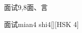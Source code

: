 \begin{entry}{面试}{9,8}{⾯、⾔}
  \begin{phonetics}{面试}{mian4 shi4}[][HSK 4]
  \end{phonetics}
\end{entry}
